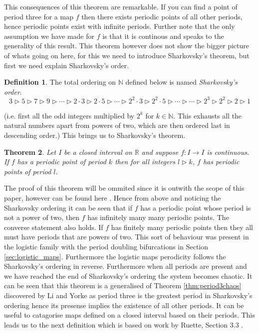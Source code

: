 \documentclass[11pt,a4paper,oneside]{memoir}
\theoremstyle{plain}
\newtheorem{thm}{Theorem}[chapter]
\theoremstyle{definition}
\newtheorem{defn}[thm]{Definition}
\begin{document}
This consequences of this theorem are remarkable. If you can find a point of period three for a map $f$ then there exists periodic points of all other periods, hence periodic points exist with infinite periods. Further note that the only assumption we have made for $f$ is that it is continous and speaks to the generality of this result. This theorem however does not show the bigger picture of whats going on here, for this we need to introduce Sharkovsky's theorem, but first we need explain Sharkovsky's order.

\begin{defn}
    The total ordering on $\mathbb{N}$ defined below is named \emph{Sharkovsky's order}. \[ 3 \rhd 5 \rhd 7 \rhd 9 \rhd \cdots \rhd 2 \cdot 3 \rhd 2 \cdot 5 \rhd \cdots \rhd 2^2 \cdot 3 \rhd 2^2 \cdot 5 \rhd \cdots \rhd \cdots \rhd 2^3 \rhd 2^2 \rhd 2 \rhd 1 \]
\end{defn}
(i.e. first all the odd integers multiplied by $2^k$ for $k \in \mathbb{N}$. This exhausts all the natural numbers apart from powers of two, which are then ordered last in descending order.) This brings us to Sharkovsky's theorem.

\begin{thm}
    Let $I$ be a closed interval on $\mathbb{R}$ and suppose $f: I \to I$ is continuous. If $f$ has a periodic point of period $k$ then for all integers $l \rhd k$, $f$ has periodic points of period $l$.
\end{thm}

The proof of this theorem will be ommited since it is outwith the scope of this paper, however can be found here \cite{sharkovsky}. Hence from above and noticing the Sharkovsky ordering it can be seen that if $f$ has a periodic point whose period is not a power of two, then $f$ has infinitely many many periodic points. The converse statement also holds. If $f$ has finitely many periodic points then they all must have periods that are powers of two. This sort of behaviour was present in the logistic family with the period doubling bifurcations in Section \ref{sec:logistic_maps}. Furthermore the logistic maps perodicity follows the Sharkovsky's ordering in reverse. Furthermore when all periods are present and we have reached the end of Sharkovsky's ordering the system becomes chaotic. It can be seen that this theorem is a generalised of Theorem \ref{thm:period3chaos} discovered by Li and Yorke \cite{li-yorke} as period three is the greatest period in Sharkovsky's ordering hence its presense implies the existence of all other periods. It can be useful to catagorise maps defined on a closed interval based on their periods. This leads us to the next definition which is based on work by Ruette, Section 3.3 \cite{ruette}.
\end{document}
